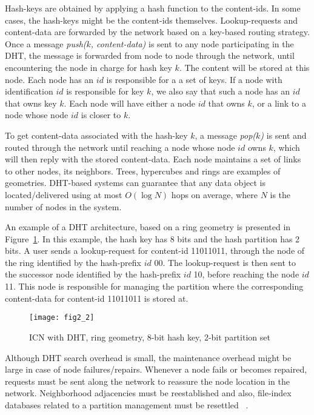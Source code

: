 Hash-keys are obtained by applying a hash function to the content-ids.  In some cases, the hash-keys might be the content-ids themselves.
 Lookup-requests 
and content-data are forwarded by the network based on a key-based routing strategy. Once a message \emph{push($k$, content-data)} 
is sent to any node participating in the DHT, the message is forwarded from node to 
node through the network, until encountering the node in charge for hash key $k$. The content will be stored at this node. Each node has an $id$ is responsible for a a set of 
keys.  If a node with identification $id$ is responsible for key $k$, we also say that such a node has an $id$ that owns key $k$.
 Each node will have either a node $id$ that owns $k$, 
or a link to a node whose node $id$ is closer to $k$. 


To get content-data associated with the hash-key $k$, a message \emph{pop($k$)} 
is sent and routed through the network until reaching a node whose node $id$ owns $k$, which will then reply with the stored content-data. 
Each node maintains a set of links to other nodes, its neighbors. Trees, hypercubes and rings are examples of geometries. 
DHT-based systems can guarantee that any data object is located/delivered using at most $O(\log N)$ hops on average, where $N$ 
is the number of nodes in the system. 


An example of a DHT architecture, based on a ring geometry is presented in Figure~\ref{systemdhticn}. In this example, the hash key  
has 8 bits and the hash partition has 2 bits. A user sends a 
lookup-request for content-id 11011011, through the node of the ring identified by the hash-prefix $id$ 00. The lookup-request is 
then sent to the successor node identified by the hash-prefix $id$ 10, before reaching the node $id$ 11. This node is responsible for managing 
the partition where the corresponding content-data for content-id 11011011 is stored at.


\begin{figure}
\center
\texttt{[image: fig2\_2]}
\caption{ICN with DHT, ring geometry, 8-bit hash key, 2-bit partition set}
\label{systemdhticn}
\end{figure}


Although DHT search overhead is small, the maintenance overhead might be large in case of node failures/repairs.  
Whenever a node fails or becomes repaired, requests must be sent along the network to reassure the node location in the network.
Neighborhood adjacencies must be reestablished and also, file-index databases related to a partition management must be resettled 
~\cite{dhtmanagement}. 



